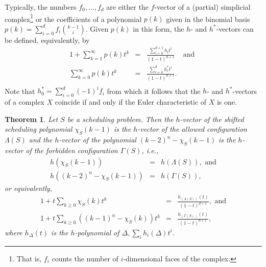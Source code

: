\documentclass[12pt,reqno]{amsart}
\numberwithin{definition}{section}
\newtheorem{theorem}[definition]{Theorem}
\theoremstyle{definition}
\newcommand{\allow}{\Lambda} %
\newcommand{\poly}{\chi} %
\newcommand{\forb}{\Gamma} %
\begin{document}
Typically, the numbers $f_0,\ldots,f_d$ are either the $f$-vector of a (partial) simplicial complex\footnote{That is, $f_i$ counts the number of $i$-dimensional faces of the complex.} or the coefficients of a polynomial $p(k)$ given in the binomial basis $p(k)=\sum_{i=0}^{d} f_i \binom{k-1}{i}$. Given $p(k)$ in this form, the $h$- and $h^*$-vectors can be defined, equivalently, by 
\begin{eqnarray*}
1 + \sum_{k=1}^\infty p(k) t^k & = &  \frac{\sum_{i=0}^{d+1}h_i t^i}{(1-t)^{d+1}} \;\;\; \text{ and } \\
\sum_{k=0}^\infty p(k) t^k & = &  \frac{\sum_{i=0}^{d}h^*_i t^i}{(1-t)^{d+1}}. \\
\end{eqnarray*}
 Note that $h^*_0=\sum_{i=0}^d (-1)^i f_i$ from which it follows that the $h$- and $h^*$-vectors of a complex $X$ coincide if and only if the Euler characteristic of $X$ is one.



\begin{theorem}
\label{hilbert}
Let $S$ be a scheduling problem. Then the $h$-vector of the shifted scheduling polynomial $\poly_S(k-1)$ is the $h$-vector of the allowed configuration $\allow(S)$ and the $h$-vector of the polynomial $(k-2)^n-\poly_S(k-1)$ is the $h$-vector of the forbidden configuration $\forb(S)$, i.e.,
\begin{eqnarray*}
  h(\poly_S(k-1)) &=& h(\allow(S)),   \text{ and}\\
  h((k-2)^n - \poly_S(k-1)) &=& h(\forb(S)),
\end{eqnarray*}
or equivalently,
\begin{eqnarray*}
 1 + t\sum_{k \geq 0} \poly_S(k) t^k &=& \frac{ h_{(\allow(S))}(t)}{(1-t)^{d+1}}, \text{ and} \\
 1 + t\sum_{k \geq 0} \left( (k-1)^n - \poly_S(k) \right) t^k &=& \frac{ h_{(\forb(S))} (t)}{(1-t)^{d+1}},
\end{eqnarray*}
where $h_{\Delta}(t)$ is the $h$-polynomial of ${\Delta}, \sum_{i} h_i(\Delta) t^i$.
\end{theorem}



\end{document}
